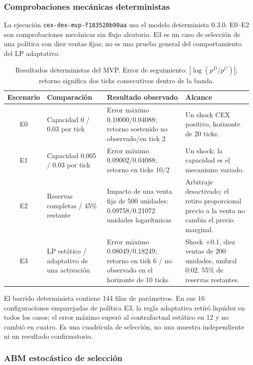 \subsubsection{Comprobaciones mecánicas deterministas}

La ejecución \texttt{cex-dex-mvp-f183520b90aa} usa el modelo determinista 0.3.0. E0--E2
son comprobaciones mecánicas sin flujo aleatorio. E3 es un caso de selección de una
política con diez ventas fijas; no es una prueba general del comportamiento del LP
adaptativo.

\begin{table}[!ht]
\centering
\scriptsize
\caption{Resultados deterministas del MVP. Error de seguimiento:
$|\log(p^D/p^C)|$; retorno significa dos ticks consecutivos dentro de la banda.}
\begin{tabularx}{\textwidth}{@{}c >{\raggedright\arraybackslash}p{3.5cm} >{\raggedright\arraybackslash}p{5.1cm} X@{}}
\toprule
\textbf{Escenario} & \textbf{Comparación} & \textbf{Resultado observado} &
\textbf{Alcance} \\
\midrule
E0 & Capacidad 0 / 0.03 por tick & Error máximo 0.10000/0.04088; retorno sostenido
  no observado/en tick 2 & Un shock CEX positivo, horizonte de 20 ticks. \\
E1 & Capacidad 0.005 / 0.03 por tick & Error máximo 0.09002/0.04088; retorno en
  ticks 10/2 & Un shock; la capacidad es el mecanismo variado. \\
E2 & Reservas completas / 45\% restante & Impacto de una venta fija de 500 unidades:
  0.09758/0.21072 unidades logarítmicas & Arbitraje desactivado; el retiro proporcional
  previo a la venta no cambia el precio marginal. \\
E3 & LP estático / adaptativo de una activación & Error máximo 0.08049/0.18249; retorno
  en tick 6 / no observado en el horizonte de 10 ticks & Shock +0.1, diez ventas de
  200 unidades, umbral 0.02, 55\% de reservas restantes. \\
\bottomrule
\end{tabularx}
\end{table}

El barrido determinista contiene 144 filas de parámetros. En sus 16 configuraciones
emparejadas de política E3, la regla adaptativa retiró liquidez en todos los casos; el
error máximo superó al contrafactual estático en 12 y no cambió en cuatro. Es una
cuadrícula de selección, no una muestra independiente ni un resultado confirmatorio.

\subsubsection{ABM estocástico de selección}

